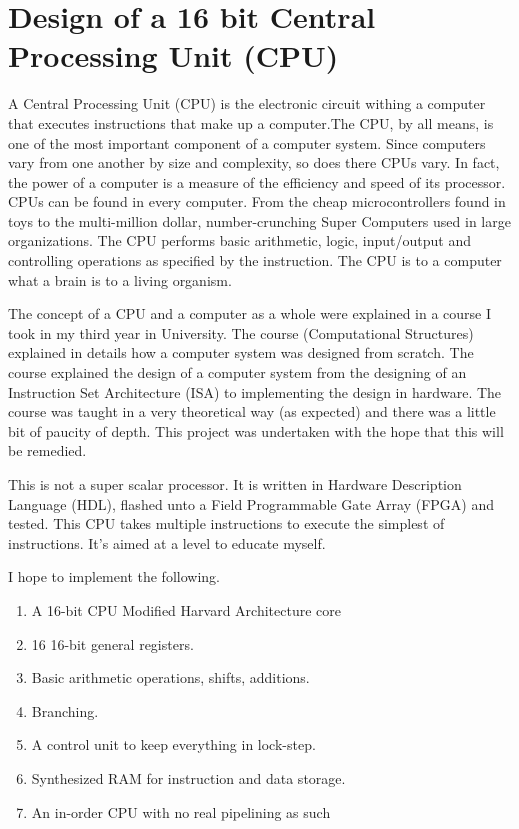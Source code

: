 \section[CPU]{Design of a 16 bit Central Processing Unit (CPU)} 
A Central Processing Unit (CPU) is the electronic circuit withing a computer that executes instructions that make up a computer.The CPU, by all means, is one of the most important component of a computer system. Since computers vary from one another by size and complexity, so does there CPUs vary. In fact, the power of a computer is a measure of the efficiency and speed of its processor. CPUs can be found in every computer. From the cheap microcontrollers found in toys to the multi-million dollar, number-crunching Super Computers used in large organizations.  The CPU performs basic arithmetic, logic, input/output and controlling operations as specified by the instruction. The CPU is to a computer what a brain is to a living organism.

The concept of a CPU and a computer as a whole were explained in a course I took in my third year in University. The course (Computational Structures) explained in details how a computer system was designed from scratch. The course explained the design of a computer system from  the designing of an Instruction Set Architecture (ISA) to implementing the design in hardware. The course was taught in a very theoretical way (as expected) and there was a little bit of paucity of depth. This project was undertaken with the hope that this will be remedied.

This is not a super scalar processor. It is written in Hardware Description Language (HDL), flashed unto a Field Programmable Gate Array (FPGA) and tested. This CPU takes multiple instructions to execute the simplest of instructions. It’s aimed at a level to educate myself.

I hope to implement the following.
\begin{enumerate}
\item A 16-bit CPU Modified Harvard Architecture core
\item 16 16-bit general registers.
\item Basic arithmetic operations, shifts, additions.
\item Branching.
\item A control unit to keep everything in lock-step.
\item Synthesized RAM for instruction and data storage.
\item An in-order CPU with no real pipelining as such
\end{enumerate}

